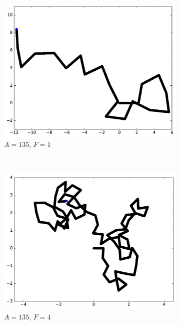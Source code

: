 \begin{appendices}
	\begin{figure}[htbp]
		\begin{subfigure}[t]{\subImgWmo}
			\centering
			\includegraphics[width=\textwidth]{figures/ch3/synTraj_219_135_1}
			\caption[$A = 135$, $F=1$]{$A = 135$, $F=1$}
			\label{fig:synTraj_219_135_1}
		\end{subfigure}
		~
		\begin{subfigure}[t]{\subImgWmo}
			\centering
			\includegraphics[width=\textwidth]{figures/ch3/synTraj_219_135_4}
			\caption[$A = 135$, $F=4$]{$A = 135$, $F=4$}
			\label{fig:synTraj_219_135_4}
		\end{subfigure}
		~
		\begin{subfigure}[t]{\subImgWmo}

\end{subfigure}
\end{figure}
\end{appendices}
